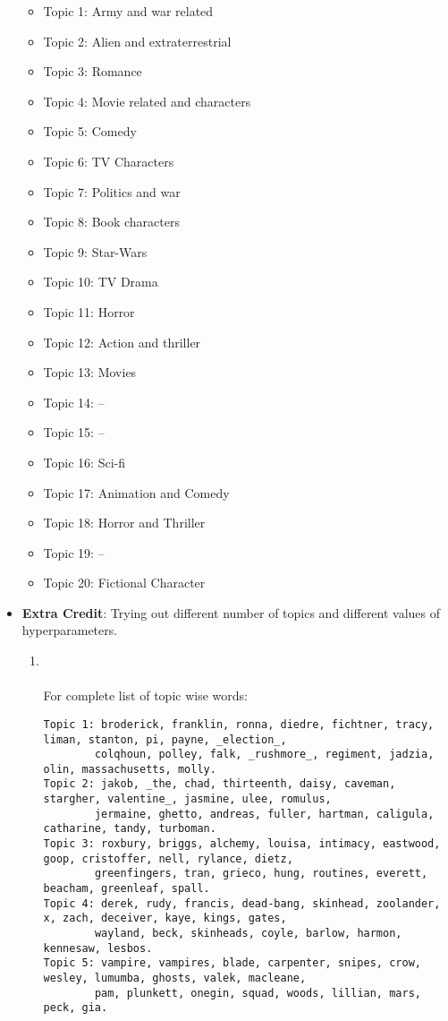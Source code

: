 \documentclass{article}[a4paper]
\begin{document}
\begin{itemize}
    \begin{itemize}
\item Topic 1: Army and war related
\item Topic 2: Alien and extraterrestrial
\item Topic 3: Romance
\item Topic 4: Movie related and characters
\item Topic 5: Comedy
\item Topic 6: TV Characters
\item Topic 7: Politics and war
\item Topic 8: Book characters
\item Topic 9: Star-Wars
\item Topic 10: TV Drama
\item Topic 11: Horror
\item Topic 12: Action and thriller
\item Topic 13: Movies
\item Topic 14: --
\item Topic 15: --
\item Topic 16: Sci-fi
\item Topic 17: Animation and Comedy
\item Topic 18:  Horror and Thriller
\item Topic 19: --
\item Topic 20: Fictional Character

    \end{itemize}
    
    
    \item \textbf{Extra Credit}: Trying out different number of topics and different values of hyperparameters.
    \begin{enumerate}
        \item {}\\
         \\
        For complete list of topic wise words: 
\begin{Verbatim}[fontsize=\footnotesize]
Topic 1: broderick, franklin, ronna, diedre, fichtner, tracy, liman, stanton, pi, payne, _election_, 
        colqhoun, polley, falk, _rushmore_, regiment, jadzia, olin, massachusetts, molly.
Topic 2: jakob, _the, chad, thirteenth, daisy, caveman, stargher, valentine_, jasmine, ulee, romulus, 
        jermaine, ghetto, andreas, fuller, hartman, caligula, catharine, tandy, turboman.
Topic 3: roxbury, briggs, alchemy, louisa, intimacy, eastwood, goop, cristoffer, nell, rylance, dietz, 
        greenfingers, tran, grieco, hung, routines, everett, beacham, greenleaf, spall.
Topic 4: derek, rudy, francis, dead-bang, skinhead, zoolander, x, zach, deceiver, kaye, kings, gates, 
        wayland, beck, skinheads, coyle, barlow, harmon, kennesaw, lesbos.
Topic 5: vampire, vampires, blade, carpenter, snipes, crow, wesley, lumumba, ghosts, valek, macleane, 
        pam, plunkett, onegin, squad, woods, lillian, mars, peck, gia.
\end{Verbatim}
        

\end{enumerate}
\end{itemize}
\end{document}
